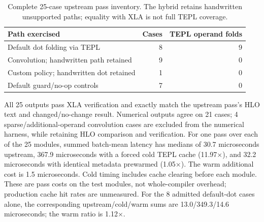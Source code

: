 \begin{table}[!htbp]
\caption{Complete 25-case upstream pass inventory. The hybrid retains
handwritten unsupported paths; equality with XLA is not full TEPL coverage.}
\label{tab:xla-integration-coverage}
\small
\begin{tabularx}{\linewidth}{@{}Yrr@{}}\toprule
Path exercised & Cases & TEPL operand folds\\\midrule
Default dot folding via TEPL & 8 & 9\\
Convolution; handwritten path retained & 9 & 0\\
Custom policy; handwritten dot retained & 1 & 0\\
Default guard/no-op controls & 7 & 0\\
\bottomrule\end{tabularx}
\end{table}
\FloatBarrier
All 25 outputs pass XLA verification and exactly match the upstream pass's HLO text and changed/no-change result. Numerical outputs agree on 21 cases; 4 sparse/additional-operand convolution cases are excluded from the numerical harness, while retaining HLO comparison and verification.
For one pass over each of the 25 modules, summed batch-mean latency has medians of 30.7 microseconds upstream, 367.9 microseconds with a forced cold TEPL cache (11.97$\times$), and 32.2 microseconds with identical metadata prewarmed (1.05$\times$). The warm additional cost is 1.5 microseconds. Cold timing includes cache clearing before each module. These are pass costs on the test modules, not whole-compiler overhead; production cache hit rates are unmeasured.
For the 8 admitted default-dot cases alone, the corresponding upstream/cold/warm sums are 13.0/349.3/14.6 microseconds; the warm ratio is 1.12$\times$.
